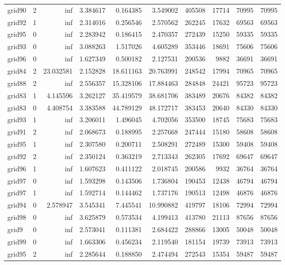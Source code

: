 \begin{longtable}{|l|r|r|r|r|r|r|r|r|r|}
grid90 & 2 & inf & 3.384617 & 0.164385 & 3.549002 & 405508 & 17714 & 70995 & 70995 \\
grid92 & 1 & inf & 2.314016 & 0.256546 & 2.570562 & 262245 & 17632 & 69563 & 69563 \\
grid95 & 0 & inf & 2.283942 & 0.186415 & 2.470357 & 272439 & 15250 & 59335 & 59335 \\
grid93 & 0 & inf & 3.088263 & 1.517026 & 4.605289 & 353446 & 18691 & 75606 & 75606 \\
grid96 & 0 & inf & 1.627349 & 0.500182 & 2.127531 & 200536 & 9882 & 36691 & 36691 \\
grid84 & 2 & 23.032581 & 2.152828 & 18.611163 & 20.763991 & 248542 & 17994 & 70965 & 70965 \\
grid88 & 2 & inf & 2.556357 & 15.328106 & 17.884463 & 284848 & 24421 & 95723 & 95723 \\
grid83 & 1 & 4.145596 & 3.262127 & 35.419579 & 38.681706 & 383489 & 20676 & 84382 & 84382 \\
grid83 & 0 & 4.408754 & 3.383588 & 44.789129 & 48.172717 & 383453 & 20640 & 84330 & 84330 \\
grid93 & 1 & inf & 3.206011 & 1.496045 & 4.702056 & 353500 & 18745 & 75683 & 75683 \\
grid91 & 2 & inf & 2.068673 & 0.188995 & 2.257668 & 247444 & 15180 & 58608 & 58608 \\
grid95 & 1 & inf & 2.307580 & 0.200711 & 2.508291 & 272489 & 15300 & 59408 & 59408 \\
grid92 & 2 & inf & 2.350124 & 0.363219 & 2.713343 & 262305 & 17692 & 69647 & 69647 \\
grid96 & 1 & inf & 1.607623 & 0.411122 & 2.018745 & 200586 & 9932 & 36764 & 36764 \\
grid97 & 0 & inf & 1.593298 & 0.143506 & 1.736804 & 190453 & 12438 & 46794 & 46794 \\
grid97 & 1 & inf & 1.592714 & 0.144462 & 1.737176 & 190513 & 12498 & 46876 & 46876 \\
grid94 & 0 & 2.578947 & 3.545341 & 7.445541 & 10.990882 & 419797 & 18106 & 72994 & 72994 \\
grid98 & 0 & inf & 3.625879 & 0.573534 & 4.199413 & 413780 & 21113 & 87656 & 87656 \\
grid9 & 0 & inf & 2.573041 & 0.111381 & 2.684422 & 288866 & 13005 & 50048 & 50048 \\
grid99 & 0 & inf & 1.663306 & 0.456234 & 2.119540 & 181154 & 19739 & 73913 & 73913 \\
grid95 & 2 & inf & 2.285644 & 0.188850 & 2.474494 & 272543 & 15354 & 59487 & 59487 \\

\end{longtable}
